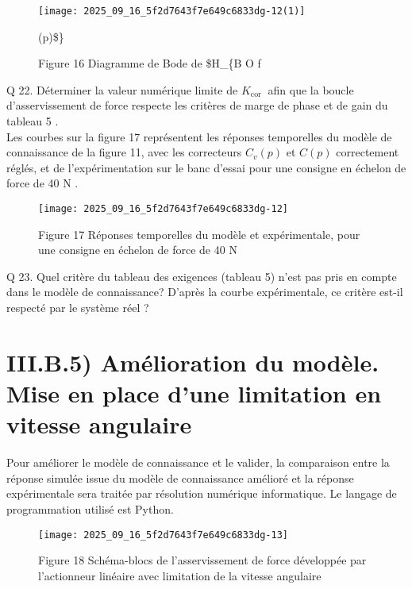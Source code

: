\begin{figure}[h]
\begin{center}
  \texttt{[image: 2025\_09\_16\_5f2d7643f7e649c6833dg-12(1)]}
\captionsetup{labelformat=empty}
\caption{Figure 16 Diagramme de Bode de \$H\_\{B O f}(p)\$\}\end{center}
\end{figure}

Q 22. Déterminer la valeur numérique limite de $K_{\text {cor }}$ afin que la boucle d'asservissement de force respecte les critères de marge de phase et de gain du tableau 5 .\\
Les courbes sur la figure 17 représentent les réponses temporelles du modèle de connaissance de la figure 11, avec les correcteurs $C_{v}(p)$ et $C(p)$ correctement réglés, et de l'expérimentation sur le banc d'essai pour une consigne en échelon de force de 40 N .

\begin{figure}[h]
\begin{center}
  \texttt{[image: 2025\_09\_16\_5f2d7643f7e649c6833dg-12]}
\captionsetup{labelformat=empty}
\caption{Figure 17 Réponses temporelles du modèle et expérimentale, pour une consigne en échelon de force de 40 N}
\end{center}
\end{figure}

Q 23. Quel critère du tableau des exigences (tableau 5) n'est pas pris en compte dans le modèle de connaissance? D'après la courbe expérimentale, ce critère est-il respecté par le système réel ?

\section{III.B.5) Amélioration du modèle. Mise en place d'une limitation en vitesse angulaire}
Pour améliorer le modèle de connaissance et le valider, la comparaison entre la réponse simulée issue du modèle de connaissance amélioré et la réponse expérimentale sera traitée par résolution numérique informatique. Le langage de programmation utilisé est Python.

\begin{figure}[h]
\begin{center}
  \texttt{[image: 2025\_09\_16\_5f2d7643f7e649c6833dg-13]}
\captionsetup{labelformat=empty}
\caption{Figure 18 Schéma-blocs de l'asservissement de force développée par l'actionneur linéaire avec limitation de la vitesse angulaire}
\end{center}
\end{figure}

